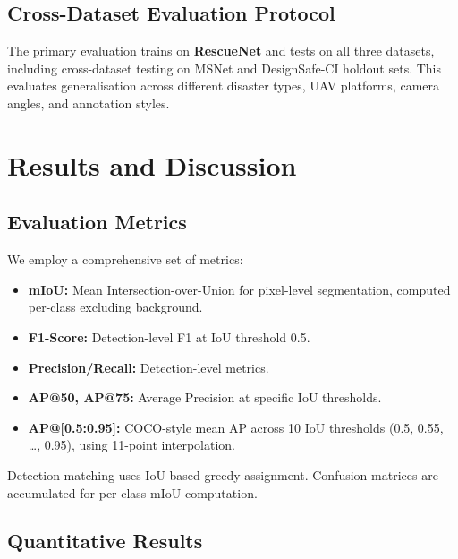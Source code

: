 \documentclass[10pt,a4paper,twocolumn]{article}
\begin{document}
\subsection{Cross-Dataset Evaluation Protocol}

The primary evaluation trains on \textbf{RescueNet} and tests on all three datasets, including cross-dataset testing on MSNet and DesignSafe-CI holdout sets. This evaluates generalisation across different disaster types, UAV platforms, camera angles, and annotation styles.


\section{Results and Discussion}

\subsection{Evaluation Metrics}

We employ a comprehensive set of metrics:
\begin{itemize}
  \item \textbf{mIoU:} Mean Intersection-over-Union for pixel-level segmentation, computed per-class excluding background.
  \item \textbf{F1-Score:} Detection-level F1 at IoU threshold 0.5.
  \item \textbf{Precision/Recall:} Detection-level metrics.
  \item \textbf{AP@50, AP@75:} Average Precision at specific IoU thresholds.
  \item \textbf{AP@[0.5:0.95]:} COCO-style mean AP across 10 IoU thresholds (0.5, 0.55, \ldots, 0.95), using 11-point interpolation.
\end{itemize}

Detection matching uses IoU-based greedy assignment. Confusion matrices are accumulated for per-class mIoU computation.

\subsection{Quantitative Results}
\end{document}
